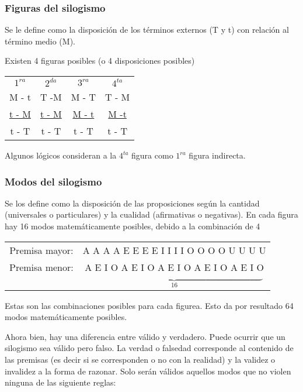 \documentclass{article}
\begin{document}
 \subsubsection{Figuras del silogismo}
 
 Se le define como la disposición de los términos externos (T y t) con relación al término medio (M).
 
 Existen 4 figuras posibles (o 4 disposiciones posibles)
 
 \begin{tabular}[c]{cccc}
 
      $1^{ra}$  & $2^{da}$ & $3^{ra}$ & $4^{ta}$ \\
      M - t & T -M & M - T & T - M \\
      \underline{t - M} & \underline{t - M} & \underline{M - t} & \underline{ M -t } \\
      t - T & t - T &  t - T & t - T \\
 \end{tabular}{}
 
 Algunos lógicos consideran a la $4^{ta}$ figura como $1^{ra}$ figura indirecta.
 
 \subsubsection{Modos del silogismo}
 Se los define como la disposición de las proposiciones según la cantidad (universales o particulares) y la cualidad (afirmativas o negativas).
 En cada figura hay 16 modos matemáticamente posibles, debido a la combinación de 4
 
 
 \begin{tabular}{cc}
      Premisa mayor: & A A A A E E E E I I I I O O O O U U U U  \\
      Premisa menor: & A E I O A E I O A E I O A E I O A E I O  \\
      & $\underbrace{\hspace{19em}}_{16}$ \\
 \end{tabular}
  
 
Estas son las combinaciones posibles para cada figurea. Esto da por resultado 64 modos matemáticamente posibles.

Ahora bien, hay una diferencia entre válido y verdadero. Puede ocurrir que un silogismo sea válido pero falso. La verdad o falsedad corresponde al contenido de las premisas (es decir si se corresponden o no con la realidad) y la validez o invalidez a la forma de razonar. Solo serán válidos aquellos modos que no violen ninguna de las siguiente reglas:
\end{document}
